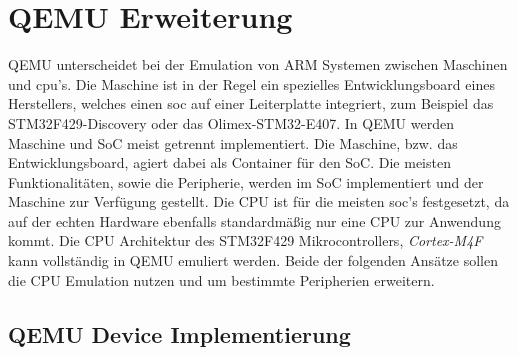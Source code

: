\section{QEMU Erweiterung}

QEMU unterscheidet bei der Emulation von ARM Systemen zwischen Maschinen und
\ac{cpu}'s.
Die Maschine ist in der Regel ein spezielles Entwicklungsboard eines
Herstellers, welches einen \ac{soc} auf einer Leiterplatte integriert, zum
Beispiel das STM32F429-Discovery\cite{Stm32F429DiscoveryBoard} oder das
Olimex-STM32-E407\cite{OlimexStm32E407Board}.
\newline
In QEMU werden Maschine und SoC meist getrennt implementiert.
Die Maschine, bzw. das Entwicklungsboard, agiert dabei als Container für den
SoC.
Die meisten Funktionalitäten, sowie die Peripherie, werden im SoC
implementiert und der Maschine zur Verfügung gestellt.
Die CPU ist für die meisten \ac{soc}'s festgesetzt, da auf der echten Hardware
ebenfalls standardmäßig nur eine CPU zur Anwendung kommt.
Die CPU Architektur des STM32F429 Mikrocontrollers, \textit{Cortex-M4F} kann
vollständig in QEMU emuliert werden.
Beide der folgenden Ansätze sollen die CPU Emulation nutzen und um bestimmte
Peripherien erweitern.

\subsection{QEMU Device Implementierung}


